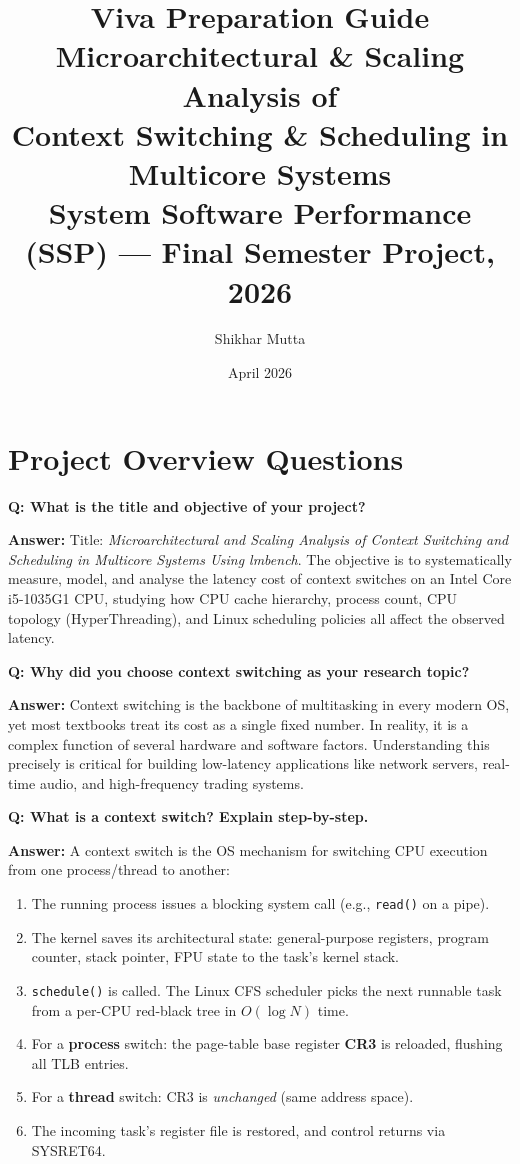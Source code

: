 \documentclass[12pt,a4paper]{article}
\title{\Huge\textbf{Viva Preparation Guide}\\[0.5em]
\Large Microarchitectural \& Scaling Analysis of\\Context Switching \& Scheduling in Multicore Systems\\[0.5em]
\large System Software Performance (SSP) --- Final Semester Project, 2026}
\author{Shikhar Mutta}
\date{April 2026}
\newcommand{\Q}[1]{\begin{mdframed}[style=qbox]
\textbf{\textcolor{qcol}{Q: #1}}\end{mdframed}\vspace{2pt}}
\newcommand{\A}[1]{\begin{mdframed}[style=abox]
\textbf{\textcolor{acol}{Answer:}} #1\end{mdframed}\vspace{10pt}}
\begin{document}
\maketitle
\tableofcontents
\newpage

\section{Project Overview Questions}

\Q{What is the title and objective of your project?}
\A{Title: \textit{Microarchitectural and Scaling Analysis of Context Switching and Scheduling in Multicore Systems Using lmbench}. The objective is to systematically measure, model, and analyse the latency cost of context switches on an Intel Core i5-1035G1 CPU, studying how CPU cache hierarchy, process count, CPU topology (HyperThreading), and Linux scheduling policies all affect the observed latency.}

\Q{Why did you choose context switching as your research topic?}
\A{Context switching is the backbone of multitasking in every modern OS, yet most textbooks treat its cost as a single fixed number. In reality, it is a complex function of several hardware and software factors. Understanding this precisely is critical for building low-latency applications like network servers, real-time audio, and high-frequency trading systems.}

\Q{What is a context switch? Explain step-by-step.}
\A{A context switch is the OS mechanism for switching CPU execution from one process/thread to another:
\begin{enumerate}[nosep]
  \item The running process issues a blocking system call (e.g., \texttt{read()} on a pipe).
  \item The kernel saves its architectural state: general-purpose registers, program counter, stack pointer, FPU state to the task's kernel stack.
  \item \texttt{schedule()} is called. The Linux CFS scheduler picks the next runnable task from a per-CPU red-black tree in $O(\log N)$ time.
  \item For a \textbf{process} switch: the page-table base register \textbf{CR3} is reloaded, flushing all TLB entries.
  \item For a \textbf{thread} switch: CR3 is \textit{unchanged} (same address space).
  \item The incoming task's register file is restored, and control returns via SYSRET64.
\end{enumerate}}
\end{document}
